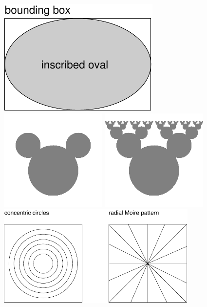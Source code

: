 \documentclass[12pt]{book}
\begin{document}
\clearpage%
\includegraphics{./figs/circle.pdf}
\clearpage%
\includegraphics[height=2in]{./figs/mickey.png}
\clearpage%
\includegraphics[height=2in]{./figs/moose.png}
\clearpage%
\includegraphics[height=2in]{./figs/moire.pdf}
\clearpage%
\end{document}
